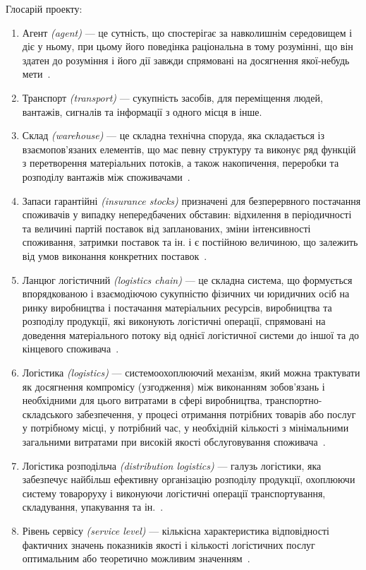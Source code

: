 Глосарій проекту:
\begin{enumerate}
    \item Агент \textit{(agent)} --- це сутність, що спостерігає за навколишнім середовищем і діє у ньому, при цьому його поведінка раціональна в тому розумінні, що він здатен до розуміння і його дії завжди спрямовані на досягнення якої-небудь мети~\cite{Jennings1998}.
    \item Транспорт \textit{(transport)} --- сукупність засобів, для переміщення людей, вантажів, сигналів та інформації з одного місця в інше.
    \item Склад \textit{(warehouse)} --- це складна технічна споруда, яка складається із взаємопов'язаних елементів, що має певну структуру та виконує ряд функцій з перетворення матеріальних потоків, а також накопичення, переробки та розподілу вантажів між споживачами~\cite{Kusluy2010}. 
	\item Запаси гарантійні \textit{(insurance stocks)} призначені для безперервного постачання споживачів у випадку непередбачених обставин: відхилення в періодичності та величині партій поставок від запланованих, зміни інтенсивності споживання, затримки поставок та ін. і є постійною величиною, що залежить від умов виконання конкретних поставок~\cite{Kusluy2010}. 
	\item Ланцюг логістичний \textit{(logistics chain)}  --- це складна система, що формується впорядкованою і взаємодіючою сукупністю фізичних чи юридичних осіб на ринку виробництва і постачання матеріальних ресурсів, виробництва та розподілу продукції, які виконують логістичні операції, спрямовані на доведення матеріального потоку від однієї логістичної системи до іншої та до кінцевого споживача~\cite{Kusluy2010}.  
    \item Логістика \textit{(logistics)} --- системоохоплюючий механізм, який можна трактувати як досягнення компромісу (узгодження) між виконанням зобов’язань і необхідними для цього витратами в сфері виробництва, транспортно-складського забезпечення, у процесі отримання потрібних товарів або послуг у потрібному місці, у потрібний час, у необхідній кількості з мінімальними загальними витратами при високій якості обслуговування споживача~\cite{Kusluy2010}.
	\item Логістика розподільча \textit{(distribution logistics)} --- галузь логістики, яка забезпечує найбільш ефективну організацію розподілу продукції, охоплюючи систему товароруху і виконуючи логістичні операції транспортування, складування, упакування та ін.~\cite{Kusluy2010}.
	\item Рівень сервісу \textit{(service level)} --- кількісна характеристика відповідності фактичних значень показників якості і кількості логістичних послуг оптимальним або теоретично можливим значенням~\cite{Kusluy2010}.

\end{enumerate}
